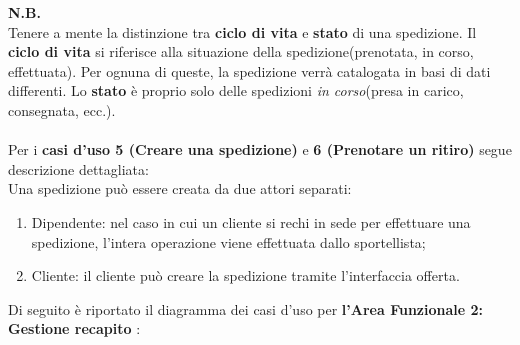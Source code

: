 \textbf{N.B.} \\
Tenere a mente la distinzione tra \textbf{ciclo di vita} e \textbf{stato} di una spedizione. Il \textbf{ciclo di vita} si riferisce
alla situazione della spedizione(prenotata, in corso, effettuata). Per ognuna di queste, la spedizione verrà catalogata in basi di dati differenti.
Lo \textbf{stato} è proprio solo delle spedizioni \textit{in corso}(presa in carico, consegnata, ecc.).
\\ \\
Per i \textbf{casi d'uso 5 (Creare una spedizione)} e \textbf{6 (Prenotare un ritiro)} segue descrizione dettagliata: \\
Una spedizione può essere creata da due attori separati:
\begin{enumerate}
  \item{Dipendente}: nel caso in cui un cliente si rechi in sede per effettuare una spedizione, l'intera operazione viene effettuata dallo sportellista;
  \item{Cliente}: il cliente può creare la spedizione tramite l'interfaccia offerta.

\end{enumerate}
Di seguito è riportato il diagramma dei casi d'uso per \textbf{l'Area Funzionale 2: Gestione recapito} :
